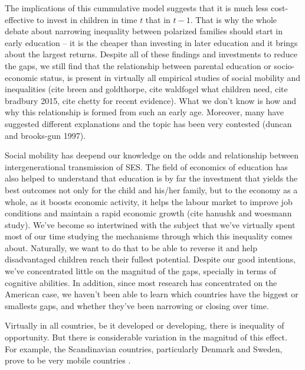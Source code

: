 \documentclass[11pt, a4paper]{article}\usepackage[]{graphicx}\usepackage[]{color}
\begin{document}
The implications of this cummulative model suggests that it is much less cost-effective to invest in children in time \(t\) that in \(t-1\). That is why the whole debate about narrowing inequality between polarized families should start in early education -- it is the cheaper than investing in later education and it brings about the largest returns. Despite all of these findings and investments to reduce the gaps, we still find that the relationship between parental education or socio-economic status, is present in virtually all empirical studies of social mobility and inequalities (cite breen and goldthorpe, cite waldfogel what children need, cite bradbury 2015, cite chetty for recent evidence). What we don't know is how and why this relationship is formed from such an early age. Moreover, many have suggested different explanations and the topic has been very contested (duncan and brooks-gun 1997).

Social mobility has deepend our knowledge on the odds and relationship between intergenerational transmission of SES. The field of economics of education has also helped to understand that education is by far the investment that yields the best outcomes not only for the child and his/her family, but to the economy as a whole, as it boosts economic activity, it helps the labour market to improve job conditions and maintain a rapid economic growth (cite hanushk and woesmann study). We've become so intertwined with the subject that we've virtually spent most of our time studying the mechanisms through which this inequality comes about. Naturally, we want to do that to be able to reverse it and help disadvantaged children reach their fullest potential. Despite our good intentions, we've concentrated little on the magnitud of the gaps, specially in terms of cognitive abilities. In addition, since most research has concentrated on the American case, we haven't been able to learn which countries have the biggest or smallests gaps, and whether they've been narrowing or closing over time.

Virtually in all countries, be it developed or developing, there is inequality of opportunity. But there is considerable variation in the magnitud of this effect. For example, the Scandinavian countries, particularly Denmark and Sweden, prove to be very mobile countries \citep{esping2012, breen2007, shavit1993}.
\end{document}
